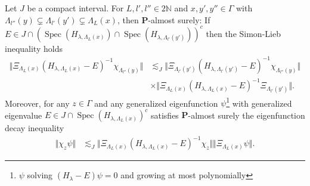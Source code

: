 \documentclass[10pt,a4paper]{amsart}
\DeclareMathOperator{\Spec}{Spec}
\begin{document}
\begin{lemm}
\label{lemm:SLIEDI}
Let $J$ be a compact interval. For $L, l',l'' \in 2\mathbb N$ and $x,y',y'' \in \Gamma$ with $\Lambda_{l''}(y) \subsetneq \Lambda_{l'}(y') \subsetneq \Lambda_L(x)$, then $\mathbf P$-almost surely: If $E \in J \cap (\Spec(H_{\lambda,\Lambda_L(x)}) \cap \Spec(H_{\lambda, \Lambda_{l'}(y')}))^c$ then the Simon-Lieb inequality holds
\[\tag{SLI} \begin{split} \Vert \Xi_{\Lambda_L(x)}(H_{\lambda,\Lambda_L(x)}-E)^{-1} \chi_{\Lambda_{l''}(y)}\Vert &\lesssim_J \Vert \Xi_{\Lambda_{l'}(y')}(H_{\lambda,\Lambda_{l'}(y')}-E)^{-1} \chi_{\Lambda_{l''}(y)} \Vert \\
&\times \Vert \Xi_{\Lambda_L(x)} (H_{\lambda,\Lambda_L(x)}-E)^{-1} \Xi_{\Lambda_{l'}(y')}\Vert.\end{split}\]
Moreover, for any $z \in \Gamma$ and any generalized eigenfunction $\psi$\footnote{ $\psi$ solving $(H_{\lambda}-E)\psi=0$ and growing at most polynomially} with generalized eigenvalue $E \in J \cap \Spec(H_{\lambda,\Lambda_L(x)})^c$ satisfies $\mathbf P$-almost surely the eigenfunction decay inequality
 \[\tag{EDI}
\begin{split} \Vert \chi_z \psi \Vert &\lesssim_J \Vert \Xi_{\Lambda_L(x)} (H_{\lambda,\Lambda_L(x)}-E)^{-1}\chi_z \Vert \Vert \Xi_{\Lambda_L(x)} \psi \Vert.
\end{split}\]
\end{lemm}
\end{document}
